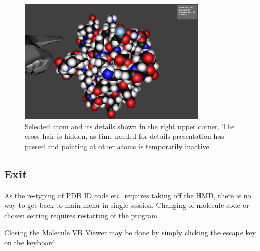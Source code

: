 \begin{figure}[!htb]
\centering    
\includegraphics[width=0.8\textwidth]{Figs/selecting.png}
\caption{Selected atom and its details shown in the right upper corner. The cross hair is hidden, as time needed for details presentation has passed and pointing at other atoms is temporarily inactive.}
\label{fig:selecting} 
\end{figure}

\subsection{Exit}

As the re-typing of PDB ID code etc. requires taking off the HMD, there is no way to get back to main menu in single session. Changing of molecule code or chosen setting requires restarting of the program. 

Closing the Molecule VR Viewer may be done by simply clicking the escape key on the keyboard. 

